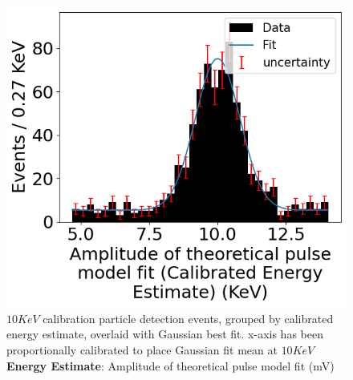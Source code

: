 \begin{figure}[H]
\begin{minipage}[t]{0.45\linewidth}
\begin{center}
			\includegraphics[width=\textwidth]{figures/pulseFit--calibrated.png}
			\caption{
                $10\unit{KeV}$ calibration particle detection events, grouped by calibrated energy estimate, overlaid with Gaussian best fit. x-axis has been proportionally calibrated to place Gaussian fit mean at $10\unit{KeV}$ \\
                \textbf{Energy Estimate}: Amplitude of theoretical pulse model fit (mV)
            }
		\end{center}
	\end{minipage}
\end{figure}
